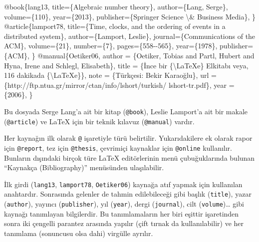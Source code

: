 \documentclass[
  letterpaper,
  DIV=11,
  numbers=noendperiod]{scrreprt}
\newenvironment{Shaded}{\begin{snugshade}}{\end{snugshade}}
\newcommand{\CharTok}[1]{\textcolor[rgb]{0.13,0.47,0.30}{#1}}
\newcommand{\DataTypeTok}[1]{\textcolor[rgb]{0.68,0.00,0.00}{#1}}
\newcommand{\NormalTok}[1]{\textcolor[rgb]{0.00,0.23,0.31}{#1}}
\newcommand{\OtherTok}[1]{\textcolor[rgb]{0.00,0.23,0.31}{#1}}
\newcommand{\VariableTok}[1]{\textcolor[rgb]{0.07,0.07,0.07}{#1}}
\begin{document}
\begin{Shaded}
\begin{Highlighting}[]
\VariableTok{@book}\NormalTok{\{}\OtherTok{lang13}\NormalTok{,}
    \DataTypeTok{title}\NormalTok{=\{Algebraic number theory\},}
    \DataTypeTok{author}\NormalTok{=\{Lang, Serge\},}
    \DataTypeTok{volume}\NormalTok{=\{110\},}
    \DataTypeTok{year}\NormalTok{=\{2013\},}
    \DataTypeTok{publisher}\NormalTok{=\{Springer Science }\CharTok{\textbackslash{}\&}\NormalTok{ Business Media\},}
\NormalTok{    \}}
\VariableTok{@article}\NormalTok{\{}\OtherTok{lamport78}\NormalTok{,}
    \DataTypeTok{title}\NormalTok{=\{Time, clocks, and the ordering of events in a}
\NormalTok{        distributed system\},}
    \DataTypeTok{author}\NormalTok{=\{Lamport, Leslie\},}
    \DataTypeTok{journal}\NormalTok{=\{Communications of the ACM\},}
    \DataTypeTok{volume}\NormalTok{=\{21\},}
    \DataTypeTok{number}\NormalTok{=\{7\},}
    \DataTypeTok{pages}\NormalTok{=\{558{-}{-}565\},}
    \DataTypeTok{year}\NormalTok{=\{1978\},}
    \DataTypeTok{publisher}\NormalTok{=\{ACM\},}
\NormalTok{\}}
\VariableTok{@manual}\NormalTok{\{}\OtherTok{Oetiker06}\NormalTok{,}
    \DataTypeTok{author}\NormalTok{ = \{Oetiker, Tobias and Partl, Hubert and Hyna, Irene}
\NormalTok{        and Schlegl, Elisabeth\},}
    \DataTypeTok{title}\NormalTok{  = \{İnce bir \{}\CharTok{\textbackslash{}LaTeXe}\NormalTok{\} Elkitabı veya, 116 dakikada}
\NormalTok{        \{}\CharTok{\textbackslash{}LaTeXe}\NormalTok{\}\},}
    \DataTypeTok{note}\NormalTok{   = \{Türkçesi: Bekir Karaoğlu\},}
    \DataTypeTok{url}\NormalTok{    = \{http://ftp.ntua.gr/mirror/ctan/info/lshort/turkish/}
\NormalTok{        lshort{-}tr.pdf\},}
    \DataTypeTok{year}\NormalTok{   = \{2006\},}
\NormalTok{\}}
\end{Highlighting}
\end{Shaded}

Bu dosyada Serge Lang'a ait bir kitap (\texttt{@book}), Leslie Lamport'a
ait bir makale (\texttt{@article}) ve {\LaTeX} için bir teknik kılavuz
(\texttt{@manual}) vardır.

Her kaynağın ilk olarak \texttt{@} işaretiyle türü belirtilir.
Yukarıdakilere ek olarak rapor için \texttt{@report}, tez için
\texttt{@thesis}, çevrimiçi kaynaklar için \texttt{@online} kullanılır.
Bunların dışındaki birçok türe {\LaTeX} editörlerinin menü
çubuğuklarında bulunan ``Kaynakça (Bibliography)'' menüsünden
ulaşılabilir.

İlk girdi (\texttt{lang13}, \texttt{lamport78}, \texttt{Oetiker06})
kaynağa atıf yapmak için kullanılan anahtardır. Sonrasında gelenler de
tahmin edilebileceği gibi başlık (\texttt{title}), yazar
(\texttt{author}), yayıncı (\texttt{publisher}), yıl (\texttt{year}),
dergi (\texttt{journal}), cilt (\texttt{volume})\ldots{} gibi kaynağı
tanımlayan bilgilerdir. Bu tanımlamaların her biri eşittir işaretinden
sonra iki çengelli parantez arasında yapılır (çift tırnak da
kullanılabilir) ve her tanımlama (sonuncusu olsa dahi) virgülle ayrılır.
\end{document}
